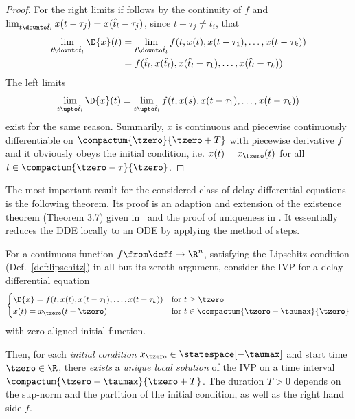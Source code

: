 \begin{proof}
        For the right limits if follows by the continuity of $f$ and $\lim_{t\downto\hat{t}_l} x(t-\tau_j) = x(\hat{t}_l-\tau_j)$, since $t-\tau_j \neq t_i$, that
        \begin{align*}
            \lim_{t\downto\hat{t}_l} \D{x}(t)
            &= \lim_{t\downto\hat{t}_l} f(t,x(t),x(t-\tau_1),\ldots,x(t-\tau_k))\\
            &= f(\hat{t}_l,x(\hat{t}_l),x(\hat{t}_l-\tau_1),\ldots,x(\hat{t}_l-\tau_k))
        \end{align*}
        The left limits
        \begin{equation*}
            \lim_{t\upto\hat{t}_l} \D{x}(t) = \lim_{t\upto\hat{t}_l} f(t,x(s),x(t-\tau_1),\ldots,x(t-\tau_k)) 
        \end{equation*}
        exist for the same reason.
        Summarily, $x$ is continuous and piecewise continuously differentiable on $\compactum{\tzero}{\tzero+T}$ with piecewise derivative $f$ and it obviously obeys the initial condition, i.e. $x(t)=x_{\tzero}(t)$ for all $t\in\compactum{\tzero-\tau}{\tzero}$.
    \end{proof}

    The most important result for the considered class of delay differential equations is the following theorem.
    Its proof is an adaption and extension of the existence theorem (Theorem 3.7) given in~\cite{Smith10IntroDDE} and the proof of uniqueness in \cite{PruessWilke10GewDiffGl}. It essentially reduces the DDE locally to an ODE by applying the method of steps.

    \begin{theorem}
        \label{thm:solution-existence}
        For a continuous function $f\from\deff\to\R^n$, satisfying the Lipschitz condition (Def.~\ref{def:lipschitz}) in all but its zeroth argument, consider the IVP for a delay differential equation
        \begin{equation}
            \begin{cases}
                \D{x} = f(t,x(t),x(t-\tau_1),\ldots,x(t-\tau_k)) & \text{for } t\geq\tzero\\
                x(t) = x_\tzero(t-\tzero) & \text{for } t\in\compactum{\tzero-\taumax}{\tzero}
            \end{cases}
        \end{equation}
        with zero-aligned initial function.
        

        Then, for each \emph{initial condition} $x_{\tzero}\in\statespace[-\taumax]$ and start time $\tzero\in\R$, there \emph{exists} a \emph{unique local solution} of the IVP on a time interval $\compactum{\tzero-\taumax}{\tzero+T}$.
        The duration $T>0$ depends on the sup-norm and the partition of the initial condition, as well as the right hand side $f$.
    \end{theorem}

